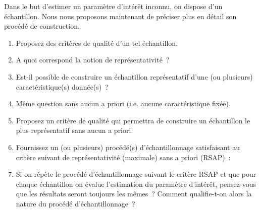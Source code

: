 \documentclass[10pt]{report}
\begin{document}
\begin{exercice}
Dans le but d'estimer un paramètre d'intérêt inconnu, on dispose d'un échantillon. Nous nous proposons maintenant de préciser plus en détail son procédé de construction.
\begin{enumerate}
\item Proposez des critères de qualité d'un tel échantillon.
\item A quoi correspond la notion de représentativité~?

\item Est-il possible de construire un échantillon représentatif d'une (ou plusieurs) caractéristique(s) donnée(s)~?

\item Même question sans aucun a priori (i.e. aucune caractéristique fixée).
\item Proposez un critère de qualité  qui permettra de construire un échantillon le plus représentatif sans aucun a priori.

\item Fournissez un (ou plusieurs) procédé(s) d'échantillonnage satisfaisant au critère suivant de représentativité (maximale) sans a priori (RSAP)~:\\
\centerline{
}

\item Si on répète le procédé d'échantillonnage suivant le critère RSAP et que pour chaque échantillon on évalue l'estimation du paramètre d'intérêt, pensez-vous que les résultats seront toujours les mêmes~? Comment qualifie-t-on alors la nature du procédé d'échantillonnage~?

\end{enumerate}
\end{exercice}
\end{document}
